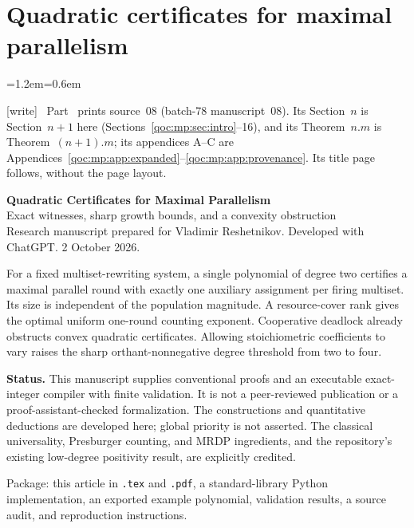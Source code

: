 \documentclass[11pt,letterpaper]{article}
\theoremstyle{definition}
\theoremstyle{remark}
\newcommand{\wtag}{\textup{[write]}}
\newenvironment{writenote}{\par\smallskip\begin{list}{}{\leftmargin=1.2em\rightmargin=0.6em}\item[]\small\wtag\ }{\end{list}\smallskip}
\begin{document}
\clearpage
\part{Quadratic certificates for maximal parallelism}\label{qoc:part:mp}

\begin{writenote}
Part~\ref{qoc:part:mp} prints source~08 (batch-78 manuscript~08). Its Section~$n$ is Section~$n+1$ here (Sections~\ref{qoc:mp:sec:intro}--16), and its Theorem~$n.m$ is Theorem~$(n+1).m$; its appendices A--C are Appendices~\ref{qoc:mp:app:expanded}--\ref{qoc:mp:app:provenance}. Its title page follows, without the page layout.
\end{writenote}

\begin{center}
{\large\bfseries Quadratic Certificates for Maximal Parallelism}\\[3pt]
{Exact witnesses, sharp growth bounds, and a convexity obstruction}\\[3pt]
{\small Research manuscript prepared for Vladimir Reshetnikov. Developed with ChatGPT. 2 October 2026.}
\end{center}

\begin{resultbox}
For a fixed multiset-rewriting system, a single polynomial of degree two
certifies a maximal parallel round with exactly one auxiliary assignment
per firing multiset. Its size is independent of the population magnitude.
A resource-cover rank gives the optimal uniform one-round counting exponent.
Cooperative deadlock already obstructs convex quadratic certificates.
Allowing stoichiometric coefficients to vary raises the sharp
orthant-nonnegative degree threshold from two to four.
\end{resultbox}

\noindent\textbf{Status.} This manuscript supplies conventional proofs and an
executable exact-integer compiler with finite validation. It is not a
peer-reviewed publication or a proof-assistant-checked formalization.
The constructions and quantitative deductions are developed here;
global priority is not asserted. The classical universality, Presburger
counting, and MRDP ingredients, and the repository's existing low-degree
positivity result, are explicitly credited.

{\small\color{Muted}Package: this article in \texttt{.tex} and \texttt{.pdf}, a
standard-library Python implementation, an exported example polynomial,
validation results, a source audit, and reproduction instructions.\par}
\end{document}

